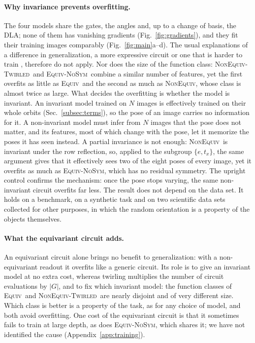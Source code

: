 \documentclass[aps,pra,reprint,superscriptaddress,longbibliography]{revtex4-2}
\newcommand{\Equiv}{\textsc{Equiv}}
\newcommand{\NonEquiv}{\textsc{NonEquiv}}
\newcommand{\Twirled}{\textsc{NonEquiv-Twirled}}
\newcommand{\NoSym}{\textsc{Equiv-NoSym}}
\begin{document}
\paragraph{Why invariance prevents overfitting.} The four models share the gates, the angles and, up to a change of basis, the DLA; none of them has vanishing gradients (Fig.~\ref{fig:gradients}), and they fit their training images comparably (Fig.~\ref{fig:main}a--d). The usual explanations of a difference in generalization, a more expressive circuit \cite{caro2022generalization, abbas2021power} or one that is harder to train \cite{mcclean2018barren, ragone2024lie, larocca2025barren}, therefore do not apply. Nor does the size of the function class: \Twirled\ and \NoSym\ combine a similar number of features, yet the first overfits as little as \Equiv\ and the second as much as \NonEquiv, whose class is almost twice as large.
What decides the overfitting is whether the model is invariant. An invariant model trained on $N$ images is effectively trained on their whole orbits (Sec.~\ref{subsec:terms}), so the pose of an image carries no information for it. A non-invariant model must infer from $N$ images that the pose does not matter, and its features, most of which change with the pose, let it memorize the poses it has seen instead. A partial invariance is not enough: \NonEquiv\ is invariant under the row reflection, so, applied to the subgroup $\{e,t_x\}$, the same argument gives that it effectively sees two of the eight poses of every image, yet it overfits as much as \NoSym, which has no residual symmetry. The upright control confirms the mechanism: once the pose stops varying, the same non-invariant circuit overfits far less. The result does not depend on the data set. It holds on a benchmark, on a synthetic task and on two scientific data sets collected for other purposes, in which the random orientation is a property of the objects themselves.

\paragraph{What the equivariant circuit adds.} An equivariant circuit alone brings no benefit to generalization: with a non-equivariant readout it overfits like a generic circuit. Its role is to give an invariant model at no extra cost, whereas twirling multiplies the number of circuit evaluations by $|G|$, and to fix which invariant model: the function classes of \Equiv\ and \Twirled\ are nearly disjoint and of very different size. Which class is better is a property of the task, as for any choice of model, and both avoid overfitting. One cost of the equivariant circuit is that it sometimes fails to train at large depth, as does \NoSym, which shares it; we have not identified the cause (Appendix~\ref{app:training}).
\end{document}
